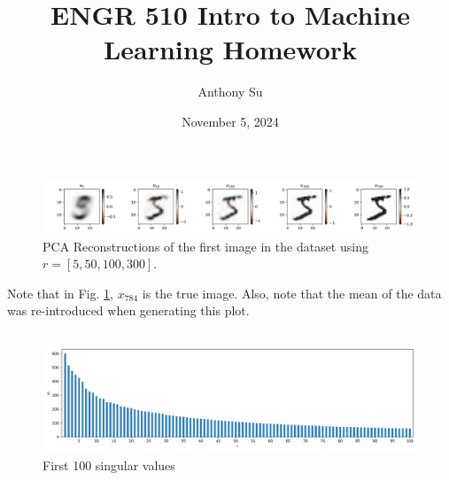 \documentclass[11pt]{article}
\title{ENGR 510 Intro to Machine Learning Homework}
\author{Anthony Su}
\date{November 5, 2024}
\begin{document}
\thispagestyle{plain}
\maketitle


\section{}

\setcounter{subsection}{1}  %

\subsection{}  %
\begin{figure}[H]
    \centering
    \includegraphics[width=\textwidth]{1.2fig1.png}
    \caption{PCA Reconstructions of the first image in the dataset using
        $r=[5, 50, 100, 300]$.}
    \label{fig_1.2_1}
\end{figure}

Note that in Fig. \ref{fig_1.2_1}, $x_{784}$ is the true image. Also, note that
the mean of the data was re-introduced when generating this plot.

\subsection{}  %
\begin{figure}[H]
    \centering
    \includegraphics[width=\textwidth]{1.3fig1.png}
    \caption{First 100 singular values}
    \label{fig_1.3_1}
\end{figure}
\end{document}
